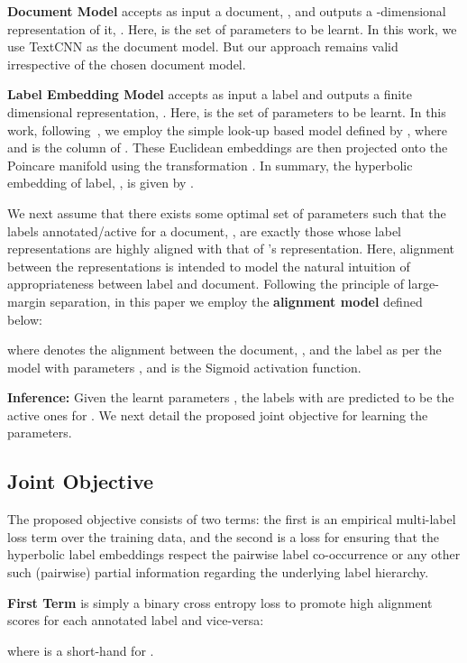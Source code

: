 \documentclass[11pt,a4paper]{article}
\begin{document}
\textbf{Document Model}  accepts as input a document, , and outputs a -dimensional representation of it, . Here,  is the set of parameters to be learnt. In this work, we use TextCNN \citep{textcnn} as the document model. But our approach remains valid irrespective of the chosen document model.

\textbf{Label Embedding Model}  accepts as input a label  and outputs  a finite dimensional representation, . Here,  is the set of parameters to be learnt. In this work, following~\citet{lorentz}, we employ the simple look-up based model defined by , where  and  is the  column of . These Euclidean embeddings  are then projected onto the Poincare manifold using the transformation . In summary, the hyperbolic embedding of label, , is given by .

We next assume that there exists some optimal set of parameters  such that the labels annotated/active for a document, , are exactly those whose label representations are highly aligned with that of 's representation. Here, alignment between the representations is intended to model the natural intuition of appropriateness between label and document. Following the principle of large-margin separation, in this paper we employ the \textbf{alignment model} defined below:

where  denotes the alignment between the document, , and the  label as per the model with parameters , and  is the Sigmoid activation function.\par

\textbf{Inference:} Given the learnt parameters , the labels with  are predicted to be the active ones for . We next detail the proposed joint objective for learning the parameters.

\subsection{Joint Objective \label{sec:jointObjective}}
The proposed objective consists of two terms: the first is an empirical multi-label loss term over the training data, and the second is a loss for ensuring that the hyperbolic label embeddings respect the pairwise label co-occurrence or any other such (pairwise) partial information regarding the underlying label hierarchy.

\textbf{First Term} is simply a binary cross entropy loss to promote high alignment scores for each annotated label and vice-versa:
\par
where  is a short-hand for .
\end{document}
